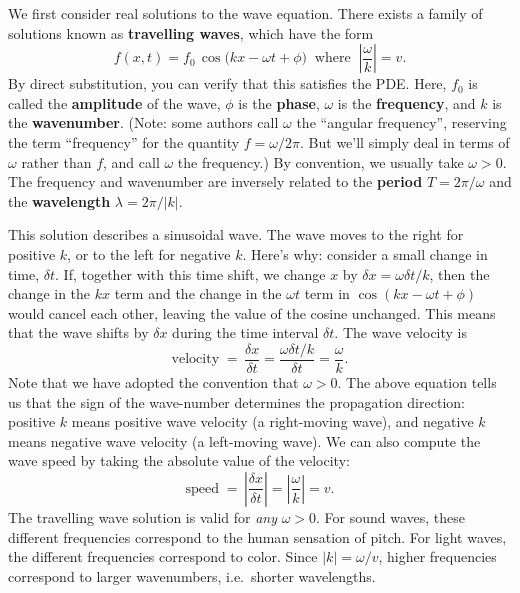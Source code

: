 \documentclass[10pt,a4paper]{article}
\begin{document}
We first consider real solutions to the wave equation. There exists a
family of solutions known as \textbf{travelling waves}, which have the
form
\begin{equation}
f(x,t) = f_0 \, \cos\big(kx - \omega t + \phi\big)\;\;\mathrm{where}\;\; \left|\frac{\omega}{k}\right| = v.
\end{equation}
By direct substitution, you can verify that this satisfies the PDE.
Here, $f_0$ is called the \textbf{amplitude} of the wave, $\phi$ is
the \textbf{phase}, $\omega$ is the \textbf{frequency}, and $k$ is
the \textbf{wavenumber}. (Note: some authors call $\omega$ the
``angular frequency'', reserving the term ``frequency'' for the quantity
$f = \omega/2\pi$. But we'll simply deal in terms of $\omega$ rather
than $f$, and call $\omega$ the frequency.) By convention, we
usually take $\omega > 0$. The frequency and wavenumber are inversely
related to the \textbf{period} $T = 2\pi/\omega$ and the
\textbf{wavelength} $\lambda = 2\pi/|k|$.

This solution describes a sinusoidal wave.  The wave moves to the
right for positive $k$, or to the left for negative $k$. Here's why:
consider a small change in time, $\delta t$. If, together with this
time shift, we change $x$ by $\delta x = \omega \delta t / k$, then
the change in the $kx$ term and the change in the $\omega t$ term in
$\cos(kx - \omega t + \phi)$ would cancel each other, leaving the
value of the cosine unchanged. This means that the wave shifts by
$\delta x$ during the time interval $\delta t$. The wave velocity is
\begin{equation}
\textrm{velocity} \; = \, \frac{\delta x}{\delta t} = \frac{\omega \delta t / k}{\delta t} = \frac{\omega}{k}.
\end{equation}
Note that we have adopted the convention that $\omega > 0$. The above
equation tells us that the sign of the wave-number determines the
propagation direction: positive $k$ means positive wave velocity (a
right-moving wave), and negative $k$ means negative wave velocity (a
left-moving wave). We can also compute the wave speed by taking the
absolute value of the velocity:
\begin{equation}
\textrm{speed}\; = \, \left|\frac{\delta x}{\delta t}\right| = \left|\frac{\omega}{k}\right| = v.
\end{equation}
The travelling wave solution is valid for \emph{any} $\omega > 0$. For
sound waves, these different frequencies correspond to the human
sensation of pitch. For light waves, the different frequencies
correspond to color. Since $|k| = \omega/v$, higher frequencies
correspond to larger wavenumbers, i.e.~shorter wavelengths.
\end{document}
